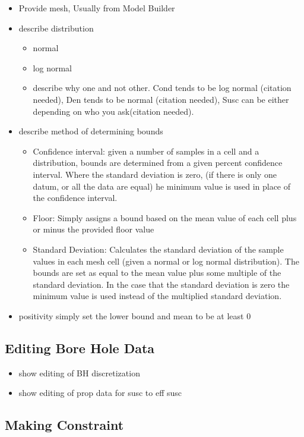 \begin{itemize}
 \item Provide mesh, Usually from Model Builder
 \item describe distribution 
 \begin{itemize}
  \item normal
  \item log normal
  \item describe why one and not other. Cond tends to be log normal (citation needed), Den tends to be normal (citation needed), Susc can be either depending on who you ask(citation needed).
 \end{itemize}
 \item describe method of determining bounds
 \begin{itemize}
  \item Confidence interval: given a number of samples in a cell and a distribution, bounds are determined from a given percent confidence interval. Where the standard deviation is zero, (if there is only one datum, or all the data are equal) he minimum value is used in place of the confidence interval.
  \item Floor: Simply assigns a bound based on the mean value of each cell plus or minus the provided floor value
  \item Standard Deviation: Calculates the standard deviation of the sample values in each mesh cell (given a normal or log normal distribution). The bounds are set as equal to the mean value plus some multiple of the standard deviation. In the case that the standard deviation is zero the minimum value is used instead of the multiplied standard deviation. 
 \end{itemize}
 \item positivity simply set the lower bound and mean to be at least 0
\end{itemize}

\subsection{Editing Bore Hole Data}
\label{subsec:visBH}

\begin{itemize}
 \item show editing of BH discretization
 \item show editing of prop data for susc to eff susc
\end{itemize}

\subsection{Making Constraint}
\label{subsec:makeConstBH}

